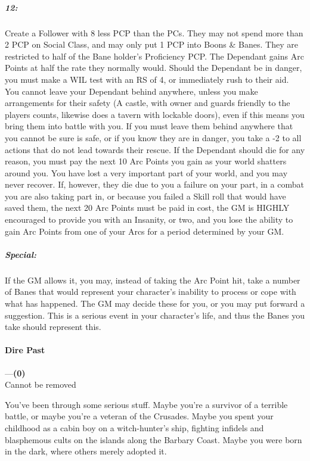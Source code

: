 \documentclass[oneside,11pt,english]{book}
\begin{document}
\subparagraph{12:} Create a Follower with 8 less PCP than the PCs. They may not spend more than 2 PCP on Social Class, and may only put 1 PCP into Boons \& Banes. They are restricted to half of the Bane holder’s Proficiency PCP. The Dependant gains Arc Points at half the rate they normally would. Should the Dependant be in danger, you must make a WIL test with an RS of 4, or immediately rush to their aid. You cannot leave your Dependant behind anywhere, unless you make arrangements for their safety (A castle, with owner and guards friendly to the players counts, likewise does a tavern with lockable doors), even if this means you bring them into battle with you. If you must leave them behind anywhere that you cannot be sure is safe, or if you know they are in danger, you take a -2 to all actions that do not lead towards their rescue. If the Dependant should die for any reason, you must pay the next 10 Arc Points you gain as your world shatters around you. You have lost a very important part of your world, and you may never recover. If, however, they die due to you a failure on your part, in a combat you are also taking part in, or because you failed a Skill roll that would have saved them, the next 20 Arc Points must be paid in cost, the GM is HIGHLY encouraged to provide you with an Insanity, or two, and you lose the ability to gain Arc Points from one of your Arcs for a period determined by your GM.\par

\subparagraph{Special:} If the GM allows it, you may, instead of taking the Arc Point hit, take a number of Banes that would represent your character’s inability to process or cope with what has happened. The GM may decide these for you, or you may put forward a suggestion. This is a serious event in your character’s life, and thus the Banes you take should represent this.
\paragraph{\label{bane:Dire Past}Dire Past}---\quad\textbf{(0) }\\
{Cannot be removed}\par
You've been through some serious stuff. Maybe you're a survivor of a terrible battle, or maybe you're a veteran of the Crusades. Maybe you spent your childhood as a cabin boy on a witch-hunter's ship, fighting infidels and blasphemous cults on the islands along the Barbary Coast. Maybe you were born in the dark, where others merely adopted it.
\end{document}
